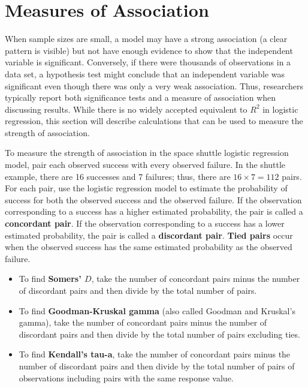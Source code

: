\documentclass[
]{report}
\begin{document}
\section{\texorpdfstring{\textbf{Measures of Association}}{Measures of Association}}\label{measures-of-association}

When sample sizes are small, a model may have a strong association (a clear pattern is visible) but not have enough evidence to show that the independent variable is significant. Conversely, if there were thousands of observations in a data set, a hypothesis test might conclude that an independent variable was significant even though there was only a very weak association. Thus, researchers typically report both significance tests and a measure of association when discussing results. While there is no widely accepted equivalent to \(R^2\) in logistic regression, this section will describe calculations that can be used to measure the strength of association.

To measure the strength of association in the space shuttle logistic regression model, pair each observed success with every observed failure. In the shuttle example, there are 16 successes and 7 failures; thus, there are \(16 \times 7 = 112\) pairs. For each pair, use the logistic regression model to estimate the probability of success for both the observed success and the observed failure. If the observation corresponding to a success has a higher estimated probability, the pair is called a \textbf{concordant pair}. If the observation corresponding to a success has a lower estimated probability, the pair is called a \textbf{discordant pair}. \textbf{Tied pairs} occur when the observed success has the same estimated probability as the observed failure.

\begin{itemize}
  \item To find \textbf{Somers’ $D$}, take the number of concordant pairs minus the number of discordant pairs and then divide by the total number of pairs.
  \item To find \textbf{Goodman-Kruskal gamma} (also called Goodman and Kruskal’s gamma), take the number of concordant pairs minus the number of discordant pairs and then divide by the total number of pairs excluding ties.
  \item To find \textbf{Kendall’s tau-a}, take the number of concordant pairs minus the number of discordant pairs and then divide by the total number of pairs of observations including pairs with the same response value.
\end{itemize}
\end{document}
